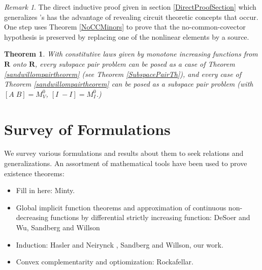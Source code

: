 \documentclass{amsproc-sunycstr}
\def\Reals{\ensuremath{\mathbf R}}
\theoremstyle{plain}
\newtheorem{theorem}{Theorem}
\theoremstyle{definition}
\theoremstyle{remark}
\newtheorem{remark}{Remark}
\newcommand{\hmat}[2]{[#1\;#2]}
\begin{document}
\begin{remark}
The direct inductive proof given in section
\ref{DirectProofSection} which generalizes
\cite{HaslerNeirynck,Fosseprez}'s has the advantage
of revealing circuit theoretic concepts that occur.
One step uses Theorem \ref{NoCCMinors} to prove that 
the no-common-covector hypothesis is preserved 
by replacing one of the nonlinear elements by 
a source.
\end{remark}



\begin{theorem}
\label{PairConclusionTheorem}
With constitutive laws given by monotone increasing functions from 
$\Reals$ onto
$\Reals$, every subspace pair problem can be posed as a case of Theorem
\ref{sandwillompairtheorem} (see Theorem \ref{SubspacePairTh}), 
and every case of Theorem
\ref{sandwillompairtheorem} can be posed as a subspace pair problem
(with $\hmat{A}{B}=M_V^0$, $\hmat{I}{-I}=M_I^0$.)
\end{theorem}



\section{Survey of Formulations}




We survey various formulations and results about them
to seek relations and generalizations.  An assortment of
mathematical tools have been used to prove existence 
theorems:
\begin{itemize}
\item Fill in here:  Minty.
\item Global implicit function theorems and approximation of 
continuous non-decreasing functions by differential
strictly increasing function: DeSoer and Wu\cite{DesoerWu}, Sandberg and
Willson\cite{SWExistanceSIAM}
\item Induction: Hasler and Neirynck \cite{HaslerNeirynck}, Sandberg and
Willson\cite[???]{SWExistancePf}, our work.
\item Convex complementarity and optiomization:  
Rockafellar\cite{RockafellarConvProg}.
\end{itemize}
\end{document}
